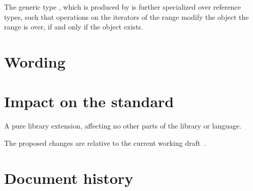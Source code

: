 \documentclass[a4paper,10pt,oneside,openany,final,article]{memoir}
\begin{document}
The generic type , which is produced by  is further specialized over reference types, such that operations on the iterators of the range modify the object the range is over, if and only if the object exists.



\chapter{Wording}

\begin{wording}



\end{wording}

\chapter{Impact on the standard}

A pure library extension, affecting no other parts of the library or language.

The proposed changes are relative to the current working draft~\cite{N4958}.

\chapter*{Document history}
\end{document}
